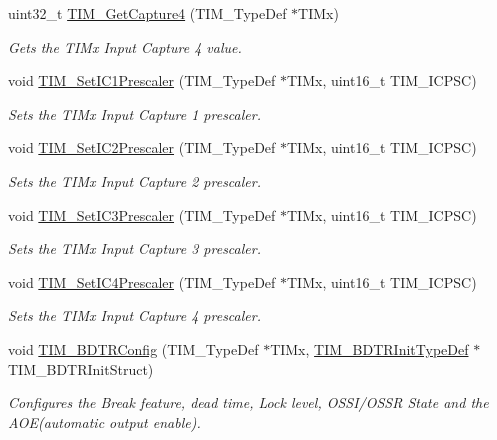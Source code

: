 \begin{DoxyCompactItemize}
uint32\-\_\-t \hyperlink{group___t_i_m_ga420b022cbc71ac603b5dd4922687abb1}{T\-I\-M\-\_\-\-Get\-Capture4} (T\-I\-M\-\_\-\-Type\-Def $\ast$T\-I\-Mx)
\begin{DoxyCompactList}\small\item\em Gets the T\-I\-Mx Input Capture 4 value. \end{DoxyCompactList}\item 
void \hyperlink{group___t_i_m_gaf0f684dea88e222de9689d8ed0ca8805}{T\-I\-M\-\_\-\-Set\-I\-C1\-Prescaler} (T\-I\-M\-\_\-\-Type\-Def $\ast$T\-I\-Mx, uint16\-\_\-t T\-I\-M\-\_\-\-I\-C\-P\-S\-C)
\begin{DoxyCompactList}\small\item\em Sets the T\-I\-Mx Input Capture 1 prescaler. \end{DoxyCompactList}\item 
void \hyperlink{group___t_i_m_ga3cc4869b5fe73271808512c89322a325}{T\-I\-M\-\_\-\-Set\-I\-C2\-Prescaler} (T\-I\-M\-\_\-\-Type\-Def $\ast$T\-I\-Mx, uint16\-\_\-t T\-I\-M\-\_\-\-I\-C\-P\-S\-C)
\begin{DoxyCompactList}\small\item\em Sets the T\-I\-Mx Input Capture 2 prescaler. \end{DoxyCompactList}\item 
void \hyperlink{group___t_i_m_ga76f906383b8132ebe00dffadb70cf7f9}{T\-I\-M\-\_\-\-Set\-I\-C3\-Prescaler} (T\-I\-M\-\_\-\-Type\-Def $\ast$T\-I\-Mx, uint16\-\_\-t T\-I\-M\-\_\-\-I\-C\-P\-S\-C)
\begin{DoxyCompactList}\small\item\em Sets the T\-I\-Mx Input Capture 3 prescaler. \end{DoxyCompactList}\item 
void \hyperlink{group___t_i_m_ga0f2c784271356d6b64b8c0da64dbdbc2}{T\-I\-M\-\_\-\-Set\-I\-C4\-Prescaler} (T\-I\-M\-\_\-\-Type\-Def $\ast$T\-I\-Mx, uint16\-\_\-t T\-I\-M\-\_\-\-I\-C\-P\-S\-C)
\begin{DoxyCompactList}\small\item\em Sets the T\-I\-Mx Input Capture 4 prescaler. \end{DoxyCompactList}\item 
void \hyperlink{group___t_i_m_ga3df4ba3f0727f63ce621e2b2e6035d4f}{T\-I\-M\-\_\-\-B\-D\-T\-R\-Config} (T\-I\-M\-\_\-\-Type\-Def $\ast$T\-I\-Mx, \hyperlink{struct_t_i_m___b_d_t_r_init_type_def}{T\-I\-M\-\_\-\-B\-D\-T\-R\-Init\-Type\-Def} $\ast$T\-I\-M\-\_\-\-B\-D\-T\-R\-Init\-Struct)
\begin{DoxyCompactList}\small\item\em Configures the Break feature, dead time, Lock level, O\-S\-S\-I/\-O\-S\-S\-R State and the A\-O\-E(automatic output enable). \end{DoxyCompactList}\item 

\end{DoxyCompactItemize}
